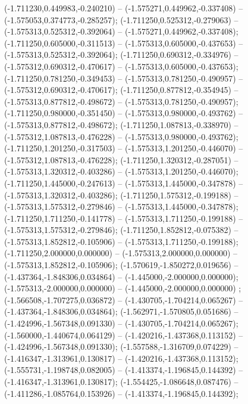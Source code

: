  (-1.711230,0.449983,-0.240210) -- (-1.575271,0.449962,-0.337408) -- (-1.575053,0.374773,-0.285257);
 (-1.711250,0.525312,-0.279063) -- (-1.575313,0.525312,-0.392064) -- (-1.575271,0.449962,-0.337408);
 (-1.711250,0.605000,-0.311513) -- (-1.575313,0.605000,-0.437653) -- (-1.575313,0.525312,-0.392064);
 (-1.711250,0.690312,-0.334976) -- (-1.575312,0.690312,-0.470617) -- (-1.575313,0.605000,-0.437653);
 (-1.711250,0.781250,-0.349453) -- (-1.575313,0.781250,-0.490957) -- (-1.575312,0.690312,-0.470617);
 (-1.711250,0.877812,-0.354945) -- (-1.575313,0.877812,-0.498672) -- (-1.575313,0.781250,-0.490957);
 (-1.711250,0.980000,-0.351450) -- (-1.575313,0.980000,-0.493762) -- (-1.575313,0.877812,-0.498672);
 (-1.711250,1.087813,-0.338970) -- (-1.575312,1.087813,-0.476228) -- (-1.575313,0.980000,-0.493762);
 (-1.711250,1.201250,-0.317503) -- (-1.575313,1.201250,-0.446070) -- (-1.575312,1.087813,-0.476228);
 (-1.711250,1.320312,-0.287051) -- (-1.575313,1.320312,-0.403286) -- (-1.575313,1.201250,-0.446070);
 (-1.711250,1.445000,-0.247613) -- (-1.575313,1.445000,-0.347878) -- (-1.575313,1.320312,-0.403286);
 (-1.711250,1.575312,-0.199188) -- (-1.575313,1.575312,-0.279846) -- (-1.575313,1.445000,-0.347878);
 (-1.711250,1.711250,-0.141778) -- (-1.575313,1.711250,-0.199188) -- (-1.575313,1.575312,-0.279846);
 (-1.711250,1.852812,-0.075382) -- (-1.575313,1.852812,-0.105906) -- (-1.575313,1.711250,-0.199188);
 (-1.711250,2.000000,0.000000) -- (-1.575313,2.000000,0.000000) -- (-1.575313,1.852812,-0.105906);
 (-1.570619,-1.850272,0.019656) -- (-1.437364,-1.848306,0.034864) -- (-1.445000,-2.000000,0.000000);
 (-1.575313,-2.000000,0.000000) -- (-1.445000,-2.000000,0.000000) ;
 (-1.566508,-1.707275,0.036872) -- (-1.430705,-1.704214,0.065267) -- (-1.437364,-1.848306,0.034864);
 (-1.562971,-1.570805,0.051686) -- (-1.424996,-1.567348,0.091330) -- (-1.430705,-1.704214,0.065267);
 (-1.560000,-1.440674,0.064129) -- (-1.420216,-1.437368,0.113152) -- (-1.424996,-1.567348,0.091330);
 (-1.557588,-1.316709,0.074229) -- (-1.416347,-1.313961,0.130817) -- (-1.420216,-1.437368,0.113152);
 (-1.555731,-1.198748,0.082005) -- (-1.413374,-1.196845,0.144392) -- (-1.416347,-1.313961,0.130817);
 (-1.554425,-1.086648,0.087476) -- (-1.411286,-1.085764,0.153926) -- (-1.413374,-1.196845,0.144392);
